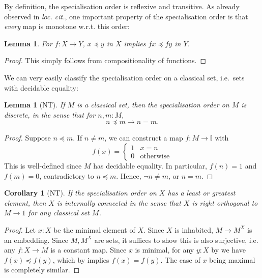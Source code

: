 \documentclass[a4paper,12pt]{amsart}
\newtheorem{lemma}[theorem]{Lemma}
\newtheorem{corollary}[theorem]{Corollary}
\theoremstyle{definition}
\newcommand{\mbb}[1]{\mathbb{#1}}
\newcommand{\I}{\mbb I}
\newcommand{\other}{\mathrm{otherwise}}
\begin{document}
By definition, the specialisation order is reflexive and transitive. As already observed in \emph{loc. cit.}, one important property of the specialisation order is that \emph{every} map is monotone w.r.t. this order:

\begin{lemma}\label{lem:anymapmonotoneintriscorder}
  For $f \colon X \to Y$, $x \preceq y$ in $X$ implies $fx \preceq fy$ in $Y$.
\end{lemma}
\begin{proof}
  This simply follows from compositionality of functions.
\end{proof}

We can very easily classify the specialisation order on a classical set, i.e.\ sets with decidable equality:

\begin{lemma}[NT]\label{lem:discretephoa}
  If $M$ is a classical set, then the specialisation order on $M$ is discrete, in the sense that for $n,m : M$,
  \[ n \preceq m \to n = m. \]
\end{lemma}
\begin{proof}
  Suppose $n \preceq m$. If $n \neq m$, we can construct a map $f \colon M \to \I$ with 
  \[ f(x) =
  \begin{cases}
    1 & x = n \\ 
    0 & \other
  \end{cases}
  \]
  This is well-defined since $M$ has decidable equality. In particular, $f(n) = 1$ and $f(m) = 0$, contradictory to $n \preceq m$. Hence, $\neg n \neq m$, or $n = m$.
\end{proof}

\begin{corollary}[NT]\label{cor:connectedpreservediscrete}
  If the specialisation order on $X$ has a least or greatest element, then $X$ is \emph{internally connected} in the sense that $X$ is right orthogonal to $M \to 1$ for any classical set $M$.
\end{corollary}
\begin{proof}
  Let $x:X$ be the minimal element of $X$. Since $X$ is inhabited, $M \to M^X$ is an embedding. Since $M,M^X$ are sets, it suffices to show this is also surjective, i.e. any $f \colon X \to M$ is a constant map. Since $x$ is minimal, for any $y:X$ by  we have $f(x) \preceq f(y)$, which by  implies $f(x) = f(y)$. The case of $x$ being maximal is completely similar.
\end{proof}
\end{document}

